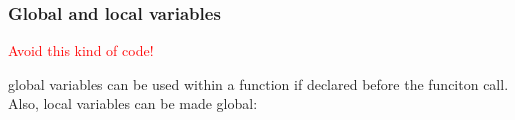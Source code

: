 \subsubsection{Global and local variables}
    {\centering\textcolor{red}{Avoid this kind of code!} \par}
    global variables can be used within a function if declared before the funciton call. Also, local variables can be made global:
    